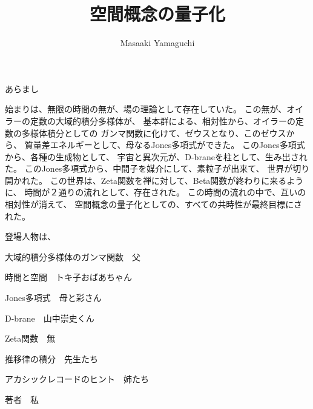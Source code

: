 \documentclass{jsarticle}
\begin{document}
\title{空間概念の量子化}
\author{Masaaki Yamaguchi}
\date{}
\maketitle

  あらまし

  始まりは、無限の時間の無が、場の理論として存在していた。
  この無が、オイラーの定数の大域的積分多様体が、
  基本群による、相対性から、オイラーの定数の多様体積分としての
  ガンマ関数に化けて、ゼウスとなり、このゼウスから、
  質量差エネルギーとして、母なるJones多項式ができた。
  このJones多項式から、各種の生成物として、
  宇宙と異次元が、D-braneを柱として、生み出された。
  このJones多項式から、中間子を媒介にして、素粒子が出来て、
  世界が切り開かれた。
  この世界は、Zeta関数を禅に対して、Beta関数が終わりに来るように、
  時間が２通りの流れとして、存在された。
  この時間の流れの中で、互いの相対性が消えて、
  空間概念の量子化としての、すべての共時性が最終目標にされた。

  登場人物は、

  大域的積分多様体のガンマ関数　父


  時間と空間　トキ子おばあちゃん


  Jones多項式　母と彩さん


  D-brane　山中崇史くん

  
  Zeta関数　無


  推移律の積分　先生たち


  アカシックレコードのヒント　姉たち


  著者　私
\end{document}
